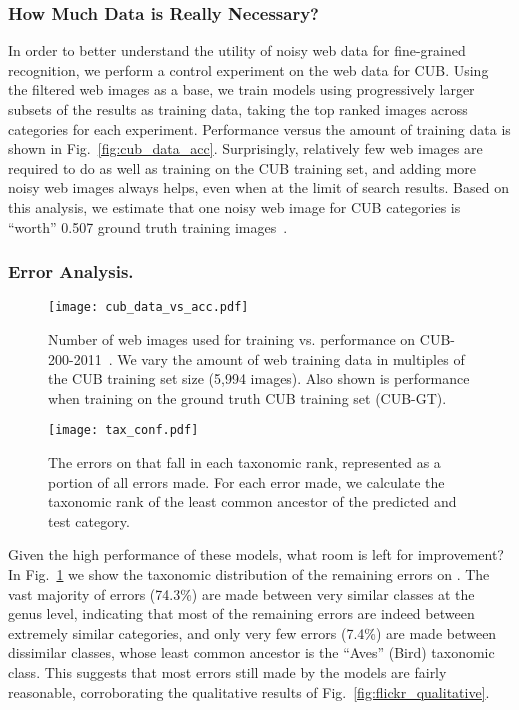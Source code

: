 \documentclass[runningheads]{llncs}
\begin{document}
\subsubsection{How Much Data is Really Necessary?}
In order to better understand the utility of noisy web data for fine-grained recognition, we perform a control experiment on the web data for CUB.
Using the filtered web images as a base, we train models using progressively larger subsets of the results as training data, taking the top ranked images across categories for each experiment.
Performance versus the amount of training data is shown in Fig.~\ref{fig:cub_data_acc}.
Surprisingly, relatively few web images are required to do as well as training on the CUB training set, and adding more noisy web images always helps, even when at the limit of search results.
Based on this analysis, we estimate that one noisy web image for CUB categories is ``worth'' 0.507 ground truth training images~\cite{torralba2011unbiased}.

\subsubsection{Error Analysis.}

\begin{figure}[t]
\begin{minipage}[t]{0.49\linewidth}
\centering
\texttt{[image: cub\_data\_vs\_acc.pdf]}
\caption{Number of web images used for training vs. performance on CUB-200-2011~\cite{wahcub2002011}.
  We vary the amount of web training data in multiples of the CUB training set size (5,994 images).
  Also shown is performance when training on the ground truth CUB training set (CUB-GT).
}
\label{fig:cub_data_acc}
\end{minipage}
\hfill
\begin{minipage}[t]{0.49\linewidth}
\centering
\texttt{[image: tax\_conf.pdf]}
\caption{
The errors on \lbird{} that fall in each taxonomic rank, represented as a portion of all errors made.
For each error made, we calculate the taxonomic rank of the least common ancestor of the predicted and test category.
}
\label{fig:hierarchy_confusion}
\end{minipage}
\end{figure}

Given the high performance of these models, what room is left for improvement?
In Fig.~\ref{fig:hierarchy_confusion} we show the taxonomic distribution of the remaining errors on \lbird{}.
The vast majority of errors (74.3\%) are made between very similar classes at the genus level, indicating that most of the remaining errors are indeed between extremely similar categories, and only very few errors (7.4\%) are made between dissimilar classes, whose least common ancestor is the ``Aves'' (\ie Bird) taxonomic class.
This suggests that most errors still made by the models are fairly reasonable, corroborating the qualitative results of Fig.~\ref{fig:flickr_qualitative}.
\end{document}
